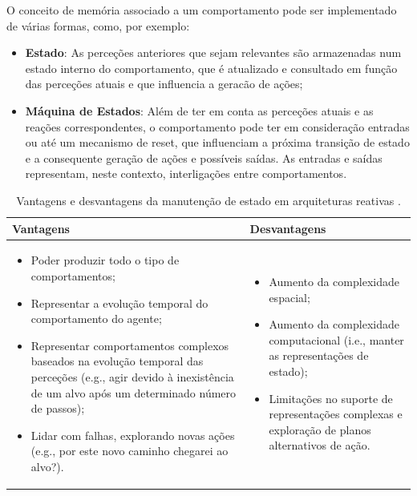 O conceito de memória associado a um comportamento pode ser implementado de várias formas, como, por exemplo:

\begin{itemize}
    \item \textbf{Estado}: As perceções anteriores que sejam relevantes são armazenadas num estado interno do comportamento, que é atualizado e consultado em função das perceções atuais e que influencia a geracão de ações;
    \item \textbf{Máquina de Estados}: Além de ter em conta as perceções atuais e as reações correspondentes, o comportamento pode ter em consideração entradas ou até um mecanismo de reset, que influenciam a próxima transição de estado e a consequente geração de ações e possíveis saídas. As entradas e saídas representam, neste contexto, interligações entre comportamentos.
\end{itemize}

\begin{table}[htbp]
    \centering
    \caption{Vantagens e desvantagens da manutenção de estado em arquiteturas reativas \cite{isel:iasa:slides:arq-agentes-reativos-parte-3}.}
    \label{tab:vantagens_desvantagens}
    \vspace{0.2cm}
    \begin{tabular}{|p{8cm}|p{8cm}|}
        \hline
        \textbf{Vantagens} & \textbf{Desvantagens} \\
        \hline
        \begin{itemize}
            \item Poder produzir todo o tipo de comportamentos;
            \item Representar a evolução temporal do comportamento do agente;
            \item Representar comportamentos complexos baseados na evolução temporal das perceções (e.g., agir devido à inexistência de um alvo após um determinado número de passos);
            \item Lidar com falhas, explorando novas ações (e.g., por este novo caminho chegarei ao alvo?).
        \end{itemize}
        &
        \begin{itemize}
            \item Aumento da complexidade espacial;
            \item Aumento da complexidade computacional (i.e., manter as representações de estado);
            \item Limitações no suporte de representações complexas e exploração de planos alternativos de ação.
        \end{itemize} \\
        \hline
    \end{tabular}
\end{table}


